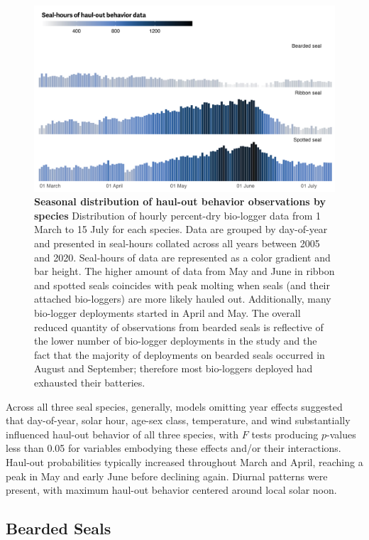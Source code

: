 \documentclass[fleqn,10pt,lineno]{wlpeerj} %
\begin{document}
\begin{figure}
\includegraphics[width=1\linewidth]{../figures/dataCal-1} \caption{\textbf{Seasonal distribution of haul-out behavior observations by species} \linebreak Distribution of hourly percent-dry bio-logger data from 1 March to 15 July for each species. Data are grouped by day-of-year and presented in seal-hours collated across all years between 2005 and 2020. Seal-hours of data are represented as a color gradient and bar height. The higher amount of data from May and June in ribbon and spotted seals coincides with peak molting when seals (and their attached bio-loggers) are more likely hauled out. Additionally, many bio-logger deployments started in April and May. The overall reduced quantity of observations from bearded seals is reflective of the lower number of bio-logger deployments in the study and the fact that the majority of deployments on bearded seals occurred in August and September; therefore most bio-loggers deployed had exhausted their batteries.}\label{fig:dataCal}
\end{figure}

Across all three seal species, generally, models omitting year effects suggested
that day-of-year, solar hour, age-sex class, temperature, and wind substantially
influenced haul-out behavior of all three species, with \(F\) tests producing
\(p\)-values less than 0.05 for variables embodying these effects and/or their
interactions. Haul-out probabilities typically increased throughout March and
April, reaching a peak in May and early June before declining again. Diurnal
patterns were present, with maximum haul-out behavior centered around local
solar noon.

\hypertarget{bearded-seals}{%
\subsection*{Bearded Seals}\label{bearded-seals}}
\end{document}
